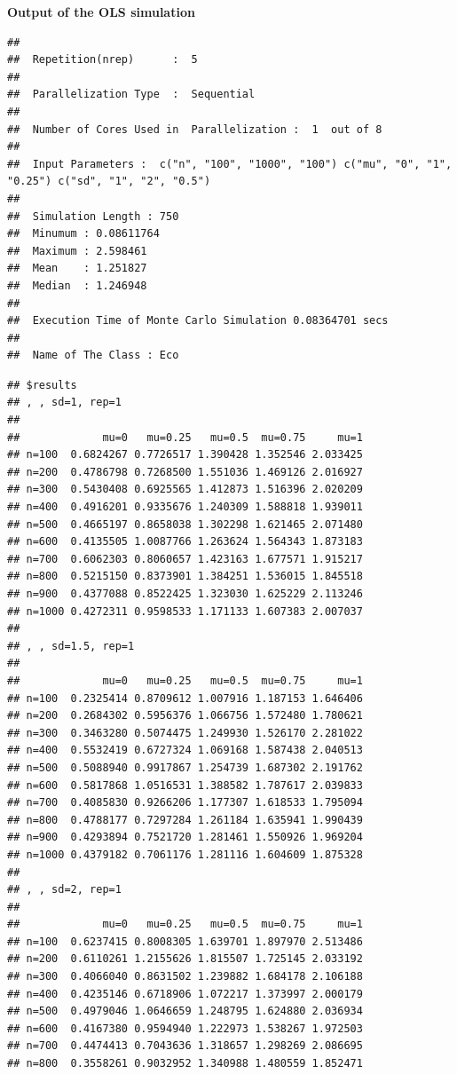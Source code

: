 \documentclass[11pt,a4paper]{article}
\begin{document}
\textbf{Output of the OLS simulation}

\begin{verbatim}
## 
##  Repetition(nrep)      :  5 
## 
##  Parallelization Type  :  Sequential 
## 
##  Number of Cores Used in  Parallelization :  1  out of 8 
## 
##  Input Parameters :  c("n", "100", "1000", "100") c("mu", "0", "1", "0.25") c("sd", "1", "2", "0.5") 
## 
##  Simulation Length : 750 
##  Minumum : 0.08611764 
##  Maximum : 2.598461 
##  Mean    : 1.251827 
##  Median  : 1.246948 
## 
##  Execution Time of Monte Carlo Simulation 0.08364701 secs 
## 
##  Name of The Class : Eco
\end{verbatim}

\begin{verbatim}
## $results
## , , sd=1, rep=1
## 
##             mu=0   mu=0.25   mu=0.5  mu=0.75     mu=1
## n=100  0.6824267 0.7726517 1.390428 1.352546 2.033425
## n=200  0.4786798 0.7268500 1.551036 1.469126 2.016927
## n=300  0.5430408 0.6925565 1.412873 1.516396 2.020209
## n=400  0.4916201 0.9335676 1.240309 1.588818 1.939011
## n=500  0.4665197 0.8658038 1.302298 1.621465 2.071480
## n=600  0.4135505 1.0087766 1.263624 1.564343 1.873183
## n=700  0.6062303 0.8060657 1.423163 1.677571 1.915217
## n=800  0.5215150 0.8373901 1.384251 1.536015 1.845518
## n=900  0.4377088 0.8522425 1.323030 1.625229 2.113246
## n=1000 0.4272311 0.9598533 1.171133 1.607383 2.007037
## 
## , , sd=1.5, rep=1
## 
##             mu=0   mu=0.25   mu=0.5  mu=0.75     mu=1
## n=100  0.2325414 0.8709612 1.007916 1.187153 1.646406
## n=200  0.2684302 0.5956376 1.066756 1.572480 1.780621
## n=300  0.3463280 0.5074475 1.249930 1.526170 2.281022
## n=400  0.5532419 0.6727324 1.069168 1.587438 2.040513
## n=500  0.5088940 0.9917867 1.254739 1.687302 2.191762
## n=600  0.5817868 1.0516531 1.388582 1.787617 2.039833
## n=700  0.4085830 0.9266206 1.177307 1.618533 1.795094
## n=800  0.4788177 0.7297284 1.261184 1.635941 1.990439
## n=900  0.4293894 0.7521720 1.281461 1.550926 1.969204
## n=1000 0.4379182 0.7061176 1.281116 1.604609 1.875328
## 
## , , sd=2, rep=1
## 
##             mu=0   mu=0.25   mu=0.5  mu=0.75     mu=1
## n=100  0.6237415 0.8008305 1.639701 1.897970 2.513486
## n=200  0.6110261 1.2155626 1.815507 1.725145 2.033192
## n=300  0.4066040 0.8631502 1.239882 1.684178 2.106188
## n=400  0.4235146 0.6718906 1.072217 1.373997 2.000179
## n=500  0.4979046 1.0646659 1.248795 1.624880 2.036934
## n=600  0.4167380 0.9594940 1.222973 1.538267 1.972503
## n=700  0.4474413 0.7043636 1.318657 1.298269 2.086695
## n=800  0.3558261 0.9032952 1.340988 1.480559 1.852471

\end{verbatim}
\end{document}
